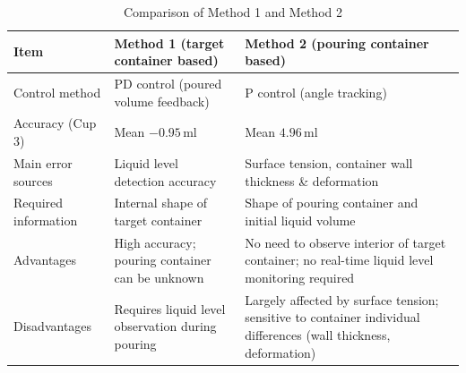 \begin{table}[!t]
  \centering
  \caption{Comparison of Method 1 and Method 2}
  \label{tab:pour_method_comparison}
    \begingroup
  \footnotesize
  \setlength{\tabcolsep}{4pt}
  \renewcommand{\arraystretch}{0.95}
  \begin{tabularx}{.75\textwidth}{@{}p{}p{}p{}@{}}
    \toprule
    Item & Method 1 (target container based) & Method 2 (pouring container based) \\
    \midrule
    Control method & PD control (poured volume feedback) & P control (angle tracking) \\
    \midrule
    Accuracy (Cup 3) & Mean $-0.95\,\mathrm{ml}$ & Mean $4.96\,\mathrm{ml}$ \\
    \midrule
    Main error sources & Liquid level detection accuracy & Surface tension, container wall thickness \& deformation \\
    \midrule
    Required information & Internal shape of target container & Shape of pouring container and initial liquid volume \\
    \midrule
    Advantages & High accuracy; pouring container can be unknown &
    No need to observe interior of target container; no real-time liquid level monitoring required \\
    \midrule
    Disadvantages & Requires liquid level observation during pouring &
    Largely affected by surface tension; sensitive to container individual differences (wall thickness, deformation) \\
    \bottomrule
  \end{tabularx}
  \endgroup
\end{table}

